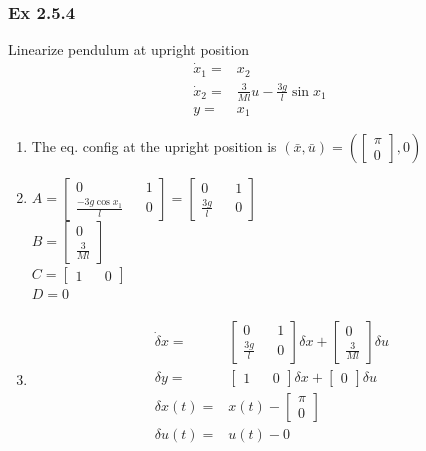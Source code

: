 \documentclass[letterpaper]{article}
\begin{document}
\subsubsection*{Ex 2.5.4}
Linearize pendulum at upright position
\begin{align*}
	\dot x_1= & x_2                                 \\
	\dot x_2= & \frac{3}{Ml}u-\frac{3g}{l}\sin{x_1} \\
	y=        & x_1                                 
\end{align*}
\begin{enumerate}
	\item The eq. config at the upright position is $(\bar x, \bar u)=(
	      \begin{bmatrix}\pi\\0\end{bmatrix}, 0)$
	\item $A=\begin{bmatrix} 0&&1\\ \frac{-3g\cos{x_1}}{l}&&0\end{bmatrix}=\begin{bmatrix}0&&1\\ \frac{3g}{l}&&0\end{bmatrix}$\\
	      $B=\begin{bmatrix}0\\\frac{3}{Ml}\end{bmatrix}$\\
	      $C=\begin{bmatrix} 1&& 0\end{bmatrix}$\\
	      $D=0$
	\item
	      \begin{align*}
	      	\dot \delta x= & \begin{bmatrix} 0 &   & 1 \\\frac{3g}{l}&&0\end{bmatrix}\delta x+\begin{bmatrix} 0\\\frac{3}{Ml}\end{bmatrix}\delta u\\
	      	\delta y=& \begin{bmatrix}1&& 0\end{bmatrix}\delta x+\begin{bmatrix}0\end{bmatrix}\delta u\\
	      	\delta x(t)=&x(t)-\begin{bmatrix}\pi\\0\end{bmatrix}\\
	      	\delta u(t)=&u(t)-0
	      \end{align*}    	
\end{enumerate}
		    
\end{document}
